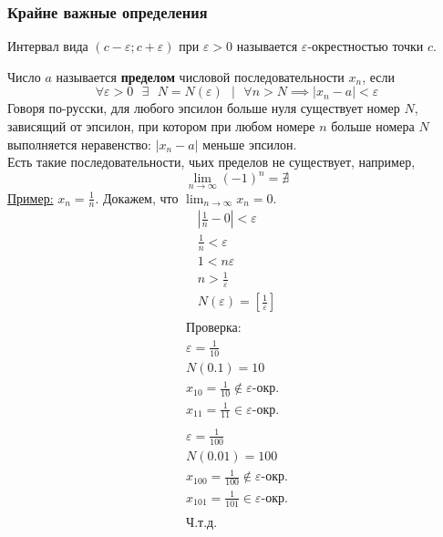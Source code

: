 \documentclass[12pt]{article}
\begin{document}
    \subsubsection*{Крайне важные определения}
    \noindent Интервал вида $(c - \varepsilon; c + \varepsilon)$ при $\varepsilon > 0$ называется $\varepsilon$-окрестностью точки $c$.\par\noindent
    Число $a$ называется \textbf{пределом} числовой последовательности $x_n$, если 
    \[\forall \varepsilon > 0 \text{ } \exists \text{ } N = N(\varepsilon) \text{ } \big| \text{ } \forall n > N \implies |x_n - a| < \varepsilon\]
    Говоря по-русски, для любого эпсилон больше нуля существует номер $N$, зависящий от эпсилон, при котором при любом номере $n$ больше номера $N$ выполняется неравенство: $|x_n - a|$ меньше эпсилон.\\
    Есть такие последовательности, чьих пределов не существует, например, \[\lim_{n\to\infty}(-1)^n = \nexists\]
    \underline{Пример:} $x_n = \frac{1}{n}$. Докажем, что $\lim_{n\to\infty}x_n = 0$.
    \begin{gather*}
        |\frac{1}{n} - 0| < \varepsilon\\
        \frac{1}{n} < \varepsilon\\
        1 < n\varepsilon\\
        n > \frac{1}{\varepsilon}\\
        N(\varepsilon) = [\frac{1}{\varepsilon}]\\
    \end{gather*}
    \begin{gather*}
        \textbf{Проверка:}\\
        \varepsilon = \frac{1}{10}\\
        N(0.1) = 10\\
        x_{10} = \frac{1}{10} \notin \varepsilon\text{-окр.}\\
        x_{11} = \frac{1}{11} \in \varepsilon\text{-окр.}\\\\ 
        \varepsilon = \frac{1}{100}\\
        N(0.01) = 100\\
        x_{100} = \frac{1}{100} \notin \varepsilon\text{-окр.}\\
        x_{101} = \frac{1}{101} \in \varepsilon\text{-окр.}\\\\
        \textbf{Ч.т.д.}
    \end{gather*}
\end{document}
